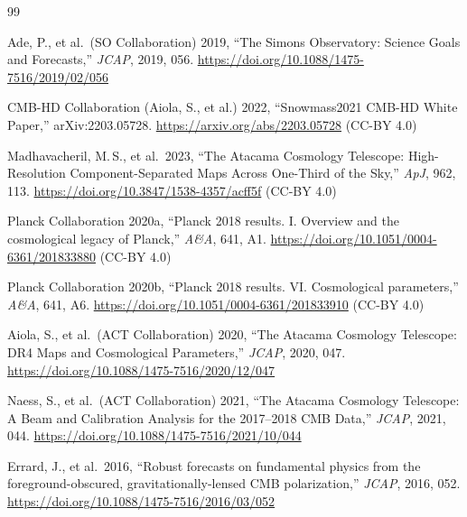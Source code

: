 \documentclass[12pt]{article}
\begin{document}
\begin{thebibliography}{99}

  Ade, P., et al.\ (SO Collaboration) 2019, ``The Simons Observatory: Science Goals and Forecasts,'' \textit{JCAP}, 2019, 056.
  \url{https://doi.org/10.1088/1475-7516/2019/02/056}

  CMB-HD Collaboration (Aiola, S., et al.) 2022, ``Snowmass2021 CMB-HD White Paper,'' arXiv:2203.05728.
  \url{https://arxiv.org/abs/2203.05728} (CC-BY 4.0)

  Madhavacheril, M.\,S., et al.\ 2023, ``The Atacama Cosmology Telescope: High-Resolution Component-Separated Maps Across One-Third of the Sky,'' \textit{ApJ}, 962, 113.
  \url{https://doi.org/10.3847/1538-4357/acff5f} (CC-BY 4.0)

  Planck Collaboration 2020a, ``Planck 2018 results. I. Overview and the cosmological legacy of Planck,'' \textit{A\&A}, 641, A1.
  \url{https://doi.org/10.1051/0004-6361/201833880} (CC-BY 4.0)

  Planck Collaboration 2020b, ``Planck 2018 results. VI. Cosmological parameters,'' \textit{A\&A}, 641, A6.
  \url{https://doi.org/10.1051/0004-6361/201833910} (CC-BY 4.0)

  Aiola, S., et al.\ (ACT Collaboration) 2020, ``The Atacama Cosmology Telescope: DR4 Maps and Cosmological Parameters,'' \textit{JCAP}, 2020, 047.
  \url{https://doi.org/10.1088/1475-7516/2020/12/047}

  Naess, S., et al.\ (ACT Collaboration) 2021, ``The Atacama Cosmology Telescope: A Beam and Calibration Analysis for the 2017--2018 CMB Data,'' \textit{JCAP}, 2021, 044.
  \url{https://doi.org/10.1088/1475-7516/2021/10/044}

  Errard, J., et al.\ 2016, ``Robust forecasts on fundamental physics from the foreground-obscured, gravitationally-lensed CMB polarization,'' \textit{JCAP}, 2016, 052.
  \url{https://doi.org/10.1088/1475-7516/2016/03/052}

\end{thebibliography}
\end{document}
